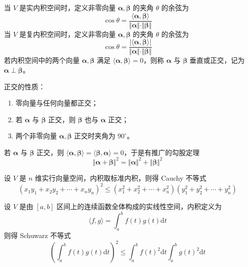 \begin{definition}
    当 $V$ 是实内积空间时，定义非零向量 $\bm{\alpha}, \bm{\beta}$ 的夹角 $\theta$ 的余弦为
    \[
        \cos \theta = \frac{\langle \bm{\alpha}, \bm{\beta} \rangle}{\Vert \bm{\alpha} \Vert \cdot \Vert \bm{\beta} \Vert}
    \]
    当 $V$ 是复内积空间时，定义非零向量 $\bm{\alpha}, \bm{\beta}$ 的夹角 $\theta$ 的余弦为
    \[
        \cos \theta = \frac{\vert \langle \bm{\alpha}, \bm{\beta} \rangle \vert}{\Vert \bm{\alpha} \Vert \cdot \Vert \bm{\beta} \Vert}
    \]
    若内积空间中的两个向量 $\bm{\alpha}, \bm{\beta}$ 满足 $\langle \bm{\alpha}, \bm{\beta} \rangle = 0$，则称 $\bm{\alpha}$ 与 $\bm{\beta}$ 垂直或正交，记为 $\bm{\alpha} \perp \bm{\beta}$。

    正交的性质：
    \begin{enumerate}
        \item 零向量与任何向量都正交；
        \item 若 $\bm{\alpha}$ 与 $\bm{\beta}$ 正交，则 $\bm{\beta}$ 也与 $\bm{\alpha}$ 正交；
        \item 两个非零向量 $\bm{\alpha}, \bm{\beta}$ 正交时夹角为 $90^{\circ}$。
    \end{enumerate}
\end{definition}

\begin{remark}
    若 $\bm{\alpha}$ 与 $\bm{\beta}$ 正交，则 $\langle \bm{\alpha}, \bm{\beta} \rangle = \langle \bm{\beta}, \bm{\alpha} \rangle = 0$，于是有推广的勾股定理
    \[
        {\Vert \bm{\alpha} + \bm{\beta} \Vert}^{2} = {\Vert \bm{\alpha} \Vert}^{2} + {\Vert \bm{\beta} \Vert}^{2}
    \]
\end{remark}

\begin{remark}
    设 $V$ 是 $n$ 维实行向量空间，内积取标准内积，则得 Cauchy 不等式
    \[
        (x_{1}y_{1} + x_{2}y_{2} + \cdots + x_{n}y_{n})^{2} \leqslant  (x_{1}^{2} + x_{2}^{2} + \cdots + x_{n}^{2})(y_{1}^{2} + y_{2}^{2} + \cdots + y_{n}^{2})
    \]
\end{remark}

\begin{remark}
    设 $V$ 是由 $[a, b]$ 区间上的连续函数全体构成的实线性空间，内积定义为
    \[
        \langle f, g \rangle = \int_{a}^{b}f(t)g(t)\mathrm{d}t
    \]
    则得 Schuwarz 不等式
    \[
        \left(\int_{a}^{b}f(t)g(t)\mathrm{d}t\right)^{2} \leqslant \int_{a}^{b}f(t)^{2}\mathrm{d}t \int_{a}^{b}g(t)^{2}\mathrm{d}t
    \]
\end{remark}

